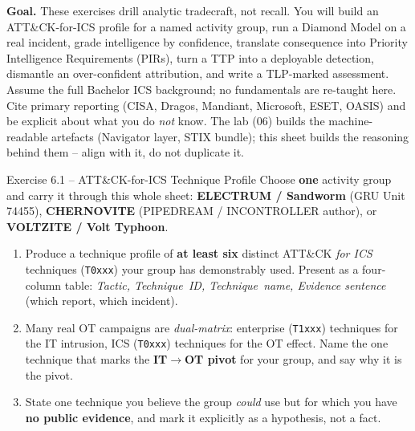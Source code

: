 \documentclass[11pt,a4paper]{article}
\begin{document}
\sheetheader

\noindent
\textbf{Goal.} These exercises drill analytic tradecraft, not recall. You will build an
ATT\&CK-for-ICS profile for a named activity group, run a Diamond Model on a real incident,
grade intelligence by confidence, translate consequence into Priority Intelligence
Requirements (PIRs), turn a TTP into a deployable detection, dismantle an over-confident
attribution, and write a TLP-marked assessment. Assume the full Bachelor ICS background; no
fundamentals are re-taught here. Cite primary reporting (CISA, Dragos, Mandiant, Microsoft,
ESET, OASIS) and be explicit about what you do \emph{not} know. The lab (06) builds the
machine-readable artefacts (Navigator layer, STIX bundle); this sheet builds the reasoning
behind them -- align with it, do not duplicate it.

\begin{taskbox}{Exercise 6.1 -- ATT\&CK-for-ICS Technique Profile}
Choose \textbf{one} activity group and carry it through this whole sheet:
\textbf{ELECTRUM / Sandworm} (GRU Unit 74455), \textbf{CHERNOVITE} (PIPEDREAM /
INCONTROLLER author), or \textbf{VOLTZITE / Volt Typhoon}.
\begin{enumerate}\setlength{\itemsep}{0pt}
  \item Produce a technique profile of \textbf{at least six} distinct ATT\&CK \emph{for ICS}
        techniques (\texttt{T0xxx}) your group has demonstrably used. Present as a four-column
        table: \emph{Tactic, Technique~ID, Technique~name, Evidence sentence} (which report,
        which incident).
  \item Many real OT campaigns are \emph{dual-matrix}: enterprise (\texttt{T1xxx}) techniques
        for the IT intrusion, ICS (\texttt{T0xxx}) techniques for the OT effect. Name the one
        technique that marks the \textbf{IT$\to$OT pivot} for your group, and say why it is the
        pivot.
  \item State one technique you believe the group \emph{could} use but for which you have
        \textbf{no public evidence}, and mark it explicitly as a hypothesis, not a fact.
\end{enumerate}
\end{taskbox}
\end{document}
